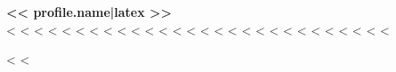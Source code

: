 \documentclass[letterpaper,11pt]{article}
\begin{document}
\begin{center}
    \textbf{\Huge << profile.name|latex >>} \\ \vspace{5pt}
    \small
<%
<%
<%
<%
<%
<%
<%
<%
<%
<%
<%
<%
<%
<%
<%
<%
<%
<%
<%
<%
<%
<%
<%
<%
<%
<%
<%
<%
    \\ \vspace{-3pt}
\end{center}

<%
<%
\end{document}
